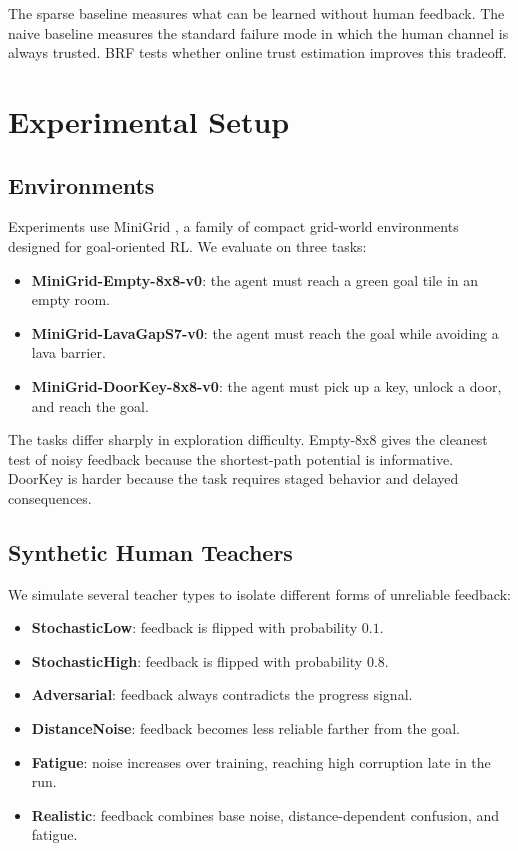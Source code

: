\documentclass[11pt]{article}
\begin{document}
The sparse baseline measures what can be learned without human feedback. The naive baseline measures the standard failure mode in which the human channel is always trusted. BRF tests whether online trust estimation improves this tradeoff.

\section{Experimental Setup}

\subsection{Environments}

Experiments use MiniGrid \cite{chevalier2023minigrid}, a family of compact grid-world environments designed for goal-oriented RL. We evaluate on three tasks:

\begin{itemize}
\item \textbf{MiniGrid-Empty-8x8-v0}: the agent must reach a green goal tile in an empty room.
\item \textbf{MiniGrid-LavaGapS7-v0}: the agent must reach the goal while avoiding a lava barrier.
\item \textbf{MiniGrid-DoorKey-8x8-v0}: the agent must pick up a key, unlock a door, and reach the goal.
\end{itemize}

The tasks differ sharply in exploration difficulty. Empty-8x8 gives the cleanest test of noisy feedback because the shortest-path potential is informative. DoorKey is harder because the task requires staged behavior and delayed consequences.

\subsection{Synthetic Human Teachers}

We simulate several teacher types to isolate different forms of unreliable feedback:

\begin{itemize}
\item \textbf{StochasticLow}: feedback is flipped with probability $0.1$.
\item \textbf{StochasticHigh}: feedback is flipped with probability $0.8$.
\item \textbf{Adversarial}: feedback always contradicts the progress signal.
\item \textbf{DistanceNoise}: feedback becomes less reliable farther from the goal.
\item \textbf{Fatigue}: noise increases over training, reaching high corruption late in the run.
\item \textbf{Realistic}: feedback combines base noise, distance-dependent confusion, and fatigue.
\end{itemize}
\end{document}
